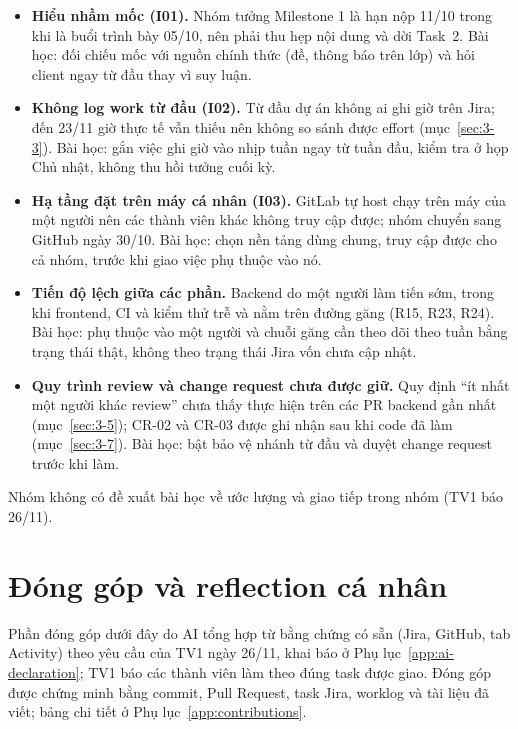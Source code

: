 \begin{itemize}
  \item \textbf{Hiểu nhầm mốc (I01).} Nhóm tưởng Milestone 1 là hạn nộp 11/10 trong khi là buổi trình bày 05/10, nên phải thu hẹp nội dung và dời Task~2. Bài học: đối chiếu mốc với nguồn chính thức (đề, thông báo trên lớp) và hỏi client ngay từ đầu thay vì suy luận.
  \item \textbf{Không log work từ đầu (I02).} Từ đầu dự án không ai ghi giờ trên Jira; đến 23/11 giờ thực tế vẫn thiếu nên không so sánh được effort (mục~\ref{sec:3-3}). Bài học: gắn việc ghi giờ vào nhịp tuần ngay từ tuần đầu, kiểm tra ở họp Chủ nhật, không thu hồi tưởng cuối kỳ.
  \item \textbf{Hạ tầng đặt trên máy cá nhân (I03).} GitLab tự host chạy trên máy của một người nên các thành viên khác không truy cập được; nhóm chuyển sang GitHub ngày 30/10. Bài học: chọn nền tảng dùng chung, truy cập được cho cả nhóm, trước khi giao việc phụ thuộc vào nó.
  \item \textbf{Tiến độ lệch giữa các phần.} Backend do một người làm tiến sớm, trong khi frontend, CI và kiểm thử trễ và nằm trên đường găng (R15, R23, R24). Bài học: phụ thuộc vào một người và chuỗi găng cần theo dõi theo tuần bằng trạng thái thật, không theo trạng thái Jira vốn chưa cập nhật.
  \item \textbf{Quy trình review và change request chưa được giữ.} Quy định ``ít nhất một người khác review'' chưa thấy thực hiện trên các PR backend gần nhất (mục~\ref{sec:3-5}); CR-02 và CR-03 được ghi nhận sau khi code đã làm (mục~\ref{sec:3-7}). Bài học: bật bảo vệ nhánh từ đầu và duyệt change request trước khi làm.
\end{itemize}

Nhóm không có đề xuất bài học về ước lượng và giao tiếp trong nhóm (TV1 báo 26/11).

\section{Đóng góp và reflection cá nhân}
\label{sec:4-6}
Phần đóng góp dưới đây do AI tổng hợp từ bằng chứng có sẵn (Jira, GitHub, tab Activity) theo yêu cầu của TV1 ngày 26/11, khai báo ở Phụ lục~\ref{app:ai-declaration}; TV1 báo các thành viên làm theo đúng task được giao. Đóng góp được chứng minh bằng commit, Pull Request, task Jira, worklog và tài liệu đã viết; bảng chi tiết ở Phụ lục~\ref{app:contributions}.

